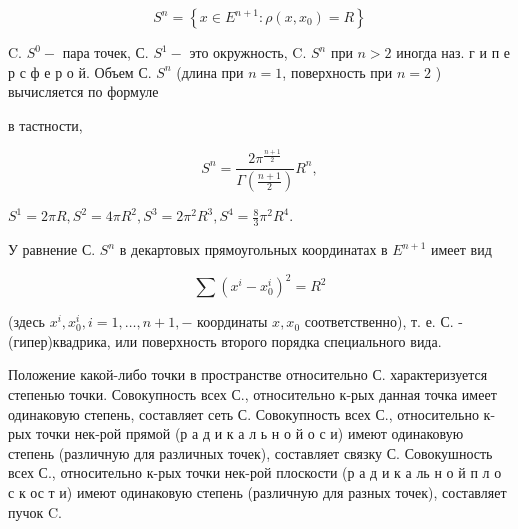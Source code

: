 \documentclass[10pt]{article}
\begin{document}
\[

S^{n}=\left\{x \in E^{n+1}: \rho\left(x, x_{0}\right)=R\right\}

\]



C. $S^{0}-$ пара точек, С. $S^{1}-$ это окружность, C. $S^{n}$ при $n>2$ иногда наз. г и п е р с ф е р о й. Объем С. $S^{n}$ (длина при $n=1$, поверхность при $n=2$ ) вычисляется по формуле



в тастности,



\[

S^{n}=\frac{2 \pi^{\frac{n+1}{2}}}{\Gamma\left(\frac{n+1}{2}\right)} R^{n},

\]



$S^{1}=2 \pi R, S^{2}=4 \pi R^{2}, S^{3}=2 \pi^{2} R^{3}, S^{4}=\frac{8}{3} \pi^{2} R^{4}$.



У равнение С. $S^{n}$ в декартовых прямоугольных координатах в $E^{n+1}$ имеет вид



\[

\sum\left(x^{i}-x_{0}^{i}\right)^{2}=R^{2}

\]



(здесь $x^{i}, x_{0}^{i}, i=1, \ldots, n+1,-$ координаты $x, x_{0}$ соответственно), т. е. С. - (гипер)квадрика, или поверхность второго порядка специального вида.



Положение какой-либо точки в пространстве относительно С. характеризуется степенью точки. Совокупность всех С., относительно к-рых данная точка имеет одинаковую степень, составляет сеть С. Совокупность всех С., относительно к-рых точки нек-рой прямой (р а д и к а л ь н о й о с и) имеют одинаковую степень (различную для различных точек), составляет связку С. Совокушность всех С., относительно к-рых точки нек-рой плоскости (р а д и к а ль н о й п л о с к ос т и) имеют одинаковую степень (различную для разных точек), составляет пучок $\mathrm{C}$.
\end{document}
